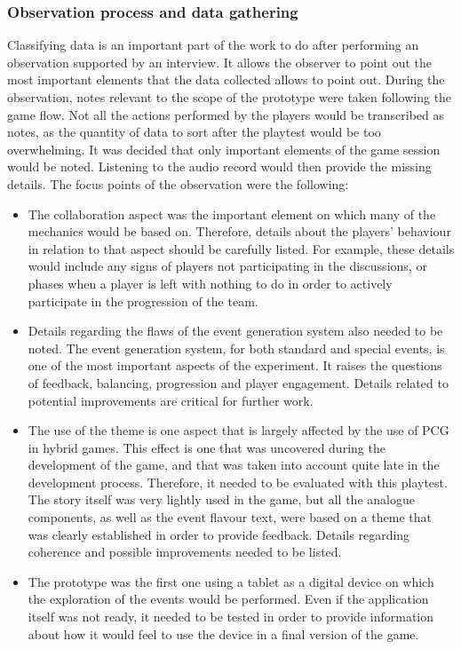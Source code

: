 \subsubsection{Observation process and data gathering}
Classifying data is an important part of the work to do after performing an observation supported by an interview. It allows the observer to point out the most important elements that the data collected allows to point out. During the observation, notes relevant to the scope of the prototype were taken following the game flow. Not all the actions performed by the players would be transcribed as notes, as the quantity of data to sort after the playtest would be too overwhelming. It was decided that only important elements of the game session would be noted. Listening to the audio record would then provide the missing details. The focus points of the observation were the following:
\begin{itemize}
\item The collaboration aspect was the important element on which many of the mechanics would be based on. Therefore, details about the players' behaviour in relation to that aspect should be carefully listed. For example, these details would include any signs of players not participating in the discussions, or phases when a player is left with nothing to do in order to actively participate in the progression of the team.
\item Details regarding the flaws of the event generation system also needed to be noted. The event generation system, for both standard and special events, is one of the most important aspects of the experiment. It raises the questions of feedback, balancing, progression and player engagement. Details related to potential improvements are critical for further work.
\item The use of the theme is one aspect that is largely affected by the use of PCG in hybrid games. This effect is one that was uncovered during the development of the game, and that was taken into account quite late in the development process. Therefore, it needed to be evaluated with this playtest. The story itself was very lightly used in the game, but all the analogue components, as well as the event flavour text, were based on a theme that was clearly established in order to provide feedback. Details regarding coherence and possible improvements needed to be listed.
\item The prototype was the first one using a tablet as a digital device on which the exploration of the events would be performed. Even if the application itself was not ready, it needed to be tested in order to provide information about how it would feel to use the device in a final version of the game. 
\end{itemize}

